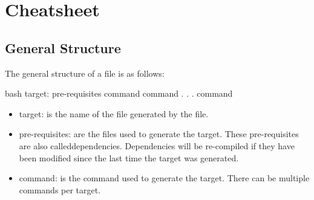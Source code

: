 \section{ Cheatsheet}

\subsection{General Structure}

The general structure of a  file is as follows:
\begin{mintedbox}{bash}
target: pre-requisites
    command
    command
    .
    .
    .
    command
\end{mintedbox}
\begin{itemize}
    \item target: is the name of the file generated by the  file.
    \item pre-requisites: are the files used to generate the target. These
    pre-requisites are also called\linebreak dependencies. Dependencies will be
    re-compiled if they have been modified since the last time the target was
    generated.
    \item command: is the command used to generate the target. There can be
    multiple commands per target.
\end{itemize}

